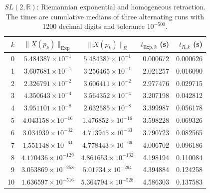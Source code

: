 \documentclass[11pt]{article}
\newcommand{\R}{\mathbb{R}}
\newcommand{\Exp}{\mathrm{Exp}}
\begin{document}
\begin{table}[H]
\centering
\scriptsize
\setlength{\tabcolsep}{4.2pt}
\begin{tabular}{rccrr}
\toprule
$k$ & $\|X(p_k)\|_{\Exp}$ & $\|X(p_k)\|_R$
& $t_{\Exp,k}$ (s) & $t_{R,k}$ (s)\\
\midrule
0 & $5.484387\times10^{-1}$ & $5.484387\times10^{-1}$ & 0.000672 & 0.000626 \\
1 & $3.607681\times10^{-1}$ & $3.256465\times10^{-1}$ & 2.021257 & 0.016090 \\
2 & $2.326791\times10^{-2}$ & $3.606411\times10^{-2}$ & 2.977476 & 0.029715 \\
3 & $4.350643\times10^{-4}$ & $3.564352\times10^{-4}$ & 3.207198 & 0.042812 \\
4 & $3.951101\times10^{-8}$ & $2.632585\times10^{-8}$ & 3.399987 & 0.056178 \\
5 & $4.043158\times10^{-16}$ & $1.476852\times10^{-16}$ & 3.598228 & 0.069326 \\
6 & $3.034939\times10^{-32}$ & $4.713945\times10^{-33}$ & 3.790723 & 0.082565 \\
7 & $1.551148\times10^{-64}$ & $4.778443\times10^{-66}$ & 4.006702 & 0.096186 \\
8 & $4.170436\times10^{-129}$ & $4.861653\times10^{-132}$ & 4.198194 & 0.110084 \\
9 & $3.053869\times10^{-258}$ & $5.01734\times10^{-264}$ & 4.394884 & 0.124258 \\
10 & $1.636597\times10^{-516}$ & $5.364794\times10^{-528}$ & 4.586303 & 0.137583 \\
\bottomrule
\end{tabular}
\caption{$SL(2,\R)$: Riemannian exponential and homogeneous retraction. The times are cumulative medians of three alternating runs with 1200 decimal digits and tolerance $10^{-500}$.}
\label{tab:supp_sl2}
\end{table}
\end{document}
